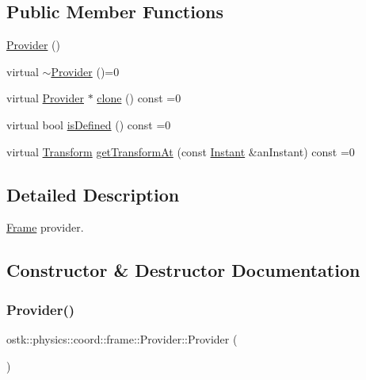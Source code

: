 \subsection*{Public Member Functions}
\begin{DoxyCompactItemize}
\item 
\hyperlink{classostk_1_1physics_1_1coord_1_1frame_1_1_provider_a627a13fa73073656b2d0b3bd81e0423e}{Provider} ()
\item 
virtual \hyperlink{classostk_1_1physics_1_1coord_1_1frame_1_1_provider_a6d84675199cb79c56de9189e91dbfe81}{$\sim$\+Provider} ()=0
\item 
virtual \hyperlink{classostk_1_1physics_1_1coord_1_1frame_1_1_provider}{Provider} $\ast$ \hyperlink{classostk_1_1physics_1_1coord_1_1frame_1_1_provider_ae41bc3862d088e9c8d90a79253294ce9}{clone} () const =0
\item 
virtual bool \hyperlink{classostk_1_1physics_1_1coord_1_1frame_1_1_provider_a27acab0012649796b97956fed1a91493}{is\+Defined} () const =0
\item 
virtual \hyperlink{classostk_1_1physics_1_1coord_1_1_transform}{Transform} \hyperlink{classostk_1_1physics_1_1coord_1_1frame_1_1_provider_a38b86a589f46f8b8a9c97ab2776f37d1}{get\+Transform\+At} (const \hyperlink{classostk_1_1physics_1_1time_1_1_instant}{Instant} \&an\+Instant) const =0
\end{DoxyCompactItemize}


\subsection{Detailed Description}
\hyperlink{classostk_1_1physics_1_1coord_1_1_frame}{Frame} provider. 

\subsection{Constructor \& Destructor Documentation}
\mbox{\label{classostk_1_1physics_1_1coord_1_1frame_1_1_provider_a627a13fa73073656b2d0b3bd81e0423e}} 
\subsubsection{\texorpdfstring{Provider()}{Provider()}}
{\footnotesize\ttfamily ostk\+::physics\+::coord\+::frame\+::\+Provider\+::\+Provider (\begin{DoxyParamCaption}{ }\end{DoxyParamCaption})}

